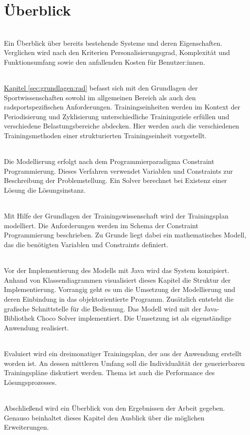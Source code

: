 \section{Überblick}
\label{sec:intro:ueberblick}
\textbf{} \\[0.2em]
Ein Überblick über bereits bestehende Systeme und deren Eigenschaften. Verglichen wird nach den Kriterien Personalisierungsgrad, Komplexität und Funktionsumfang sowie den anfallenden Kosten für Benutzer:innen.

\textbf{} \\[0.2em]
\hyperref[sec:grundlagen:rad]{Kapitel \ref{sec:grundlagen:rad}} befasst sich mit den Grundlagen der Sportwissenschaften sowohl im allgemeinen Bereich als auch den radsportspezifischen Anforderungen. Trainingseinheiten werden im Kontext der Periodisierung und Zyklisierung unterschiedliche Trainingsziele erfüllen und verschiedene Belastungsbereiche abdecken. Hier werden auch die verschiedenen Trainingsmethoden einer strukturierten Trainingseinheit vorgestellt.

\textbf{} \\[0.2em]
Die Modellierung erfolgt nach dem Programmierparadigma Constraint Programmierung. Dieses Verfahren verwendet Variablen und Constraints zur Beschreibung der Problemstellung. Ein Solver berechnet bei Existenz einer Lösung die Lösungsinstanz. 

\textbf{} \\[0.2em]
Mit Hilfe der Grundlagen der Trainingswissenschaft wird der Trainingsplan modelliert. Die Anforderungen werden im Schema der Constraint Programmierung beschrieben. Zu Grunde liegt dabei ein mathematisches Modell, das die benötigten Variablen und Constraints definiert.

\textbf{} \\[0.2em]
Vor der Implementierung des Modells mit Java wird das System konzipiert. Anhand von Klassendiagrammen visualisiert dieses Kapitel die Struktur der Implementierung. Vorrangig geht es um die Umsetzung der Modellierung und deren Einbindung in das objektorientierte Programm. Zusätzlich entsteht die grafische Schnittstelle für die Bedienung. Das Modell wird mit der Java-Bibliothek Choco Solver implementiert. Die Umsetzung ist als eigenständige Anwendung realisiert. 

\textbf{} \\[0.2em]
Evaluiert wird ein dreimonatiger Trainingsplan, der aus der Anwendung erstellt worden ist. An dessen mittleren Umfang soll die Individualität der generierbaren Trainingspläne diskutiert werden. Thema ist auch die Performance des Lösungsprozesses.

\textbf{} \\[0.2em]
Abschließend wird ein Überblick von den Ergebnissen der Arbeit gegeben. Genauso beinhaltet dieses Kapitel den Ausblick über die möglichen Erweiterungen.